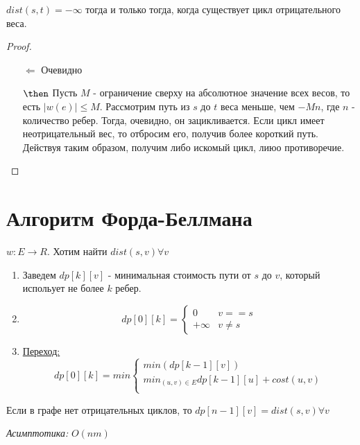 \begin{proposition}
  $dist(s, t) = -\infty$ тогда и только тогда, когда существует цикл отрицательного веса.
\end{proposition}
\begin{proof}
  \begin{enumerate}
    \item[$\Longleftarrow$] Очевидно
    \item[$\then$] Пусть $M$ - ограничение сверху на абсолютное значение всех весов, то есть $|w(e)| \le M$. Рассмотрим путь из $s$ до $t$ веса меньше, чем $-Mn$, где $n$ - количество ребер. Тогда, очевидно, он зацикливается.
  Если цикл имеет неотрицательный вес, то отбросим его, получив более короткий путь. Действуя таким образом, получим либо искомый цикл, лиюо противоречие.
  \end{enumerate}
\end{proof}

\section{Алгоритм Форда-Беллмана}
$w: E \to R$. Хотим найти $dist(s, v) \forall v$ 

\begin{enumerate}
  \item Заведем $dp[k][v]$ - минимальная стоимость пути от $s$ до $v$, который испольует не более $k$ ребер.
  \item 
 \begin{equation}
    dp[0][k] = 
    \begin{cases}
      0 & v == s\\
      +\infty & v \ne s
    \end{cases}
  \end{equation}

  \item  \underline{Переход:}
  \begin{equation}
    dp[0][k] = min
    \begin{cases}
      min(dp[k - 1][v])\\
      min_{(u, v) \in E} dp[k - 1][u] + cost(u, v)\\
    \end{cases}
  \end{equation}
\end{enumerate}

\begin{note}
Если в графе нет отрицательных циклов, то $dp[n - 1][v] = dist(s, v) \forall v$

\textit{Асимптотика:} $O(nm)$
\end{note}

